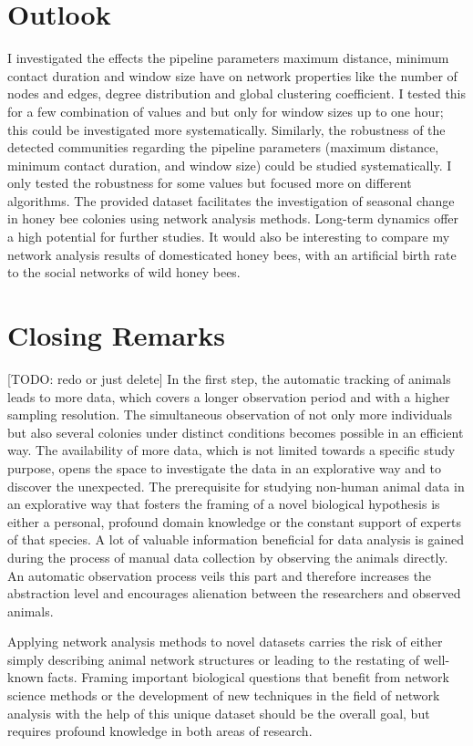 \section{Outlook}
I investigated the effects the pipeline parameters maximum distance, minimum contact duration and window size have on network properties like the number of nodes and edges, degree distribution and global clustering coefficient. I tested this for a few combination of values and but only for window sizes up to one hour; this could be investigated more systematically.
Similarly, the robustness of the detected communities regarding the pipeline parameters (maximum distance, minimum contact duration, and window size)  could be studied systematically. I only tested the robustness for some values but focused more on different algorithms.
The provided dataset facilitates the investigation of seasonal change in honey bee colonies using network analysis methods. Long-term dynamics offer a high potential for further studies.
It would also be interesting to compare my network analysis results of domesticated honey bees, with an artificial birth rate to the social networks of wild honey bees.

\section{Closing Remarks}
[TODO: redo or just delete]
In the first step, the automatic tracking of animals leads to more data, which covers a longer observation period and with a higher sampling resolution. The simultaneous observation of not only more individuals but also several colonies under distinct conditions becomes possible in an efficient way.
The availability of more data, which is not limited towards a specific study purpose, opens the space to investigate the data in an explorative way and to discover the unexpected.
The prerequisite for studying non-human animal data in an explorative way that fosters the framing of a novel biological hypothesis is either a personal, profound domain knowledge or the constant support of experts of that species.
A lot of valuable information beneficial for data analysis is gained during the process of manual data collection by observing the animals directly. An automatic observation process veils this part and therefore increases the abstraction level and encourages alienation between the researchers and observed animals.

Applying network analysis methods to novel datasets carries the risk of either simply describing animal network structures or leading to the restating of well-known facts. Framing important biological questions that benefit from network science methods or the development of new techniques in the field of network analysis with the help of this unique dataset should be the overall goal, but requires profound knowledge in both areas of research.